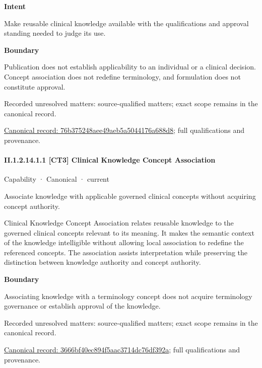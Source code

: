 \textbf{Intent}



Make reusable clinical knowledge available with the qualifications and approval standing needed to judge its use.



\textbf{Boundary}



Publication does not establish applicability to an individual or a clinical decision. Concept association does not redefine terminology, and formulation does not constitute approval.


{\small Recorded unresolved matters: source-qualified matters; exact scope remains in the canonical record.}\par
{\footnotesize \href{../../../../continuum/strategy/capability/76b375248aee49aeb5a5044176a688d8.md}{Canonical record: 76b375248aee49aeb5a5044176a688d8}; full qualifications and provenance.}\par
\paragraph*{II.1.2.14.1.1 [CT3] Clinical Knowledge Concept Association}
\label{navigation:II.1.2.14.1.1}

\label{element:3666bf40ec894f5aac3714dc76df392a}
{\small Capability · Canonical · current}\par

Associate knowledge with applicable governed clinical concepts without acquiring concept authority.



Clinical Knowledge Concept Association relates reusable knowledge to the governed clinical concepts relevant to its meaning. It makes the semantic context of the knowledge intelligible without allowing local association to redefine the referenced concepts. The association assists interpretation while preserving the distinction between knowledge authority and concept authority.



\textbf{Boundary}



Associating knowledge with a terminology concept does not acquire terminology governance or establish approval of the knowledge.


{\small Recorded unresolved matters: source-qualified matters; exact scope remains in the canonical record.}\par
{\footnotesize \href{../../../../continuum/strategy/capability/3666bf40ec894f5aac3714dc76df392a.md}{Canonical record: 3666bf40ec894f5aac3714dc76df392a}; full qualifications and provenance.}\par
